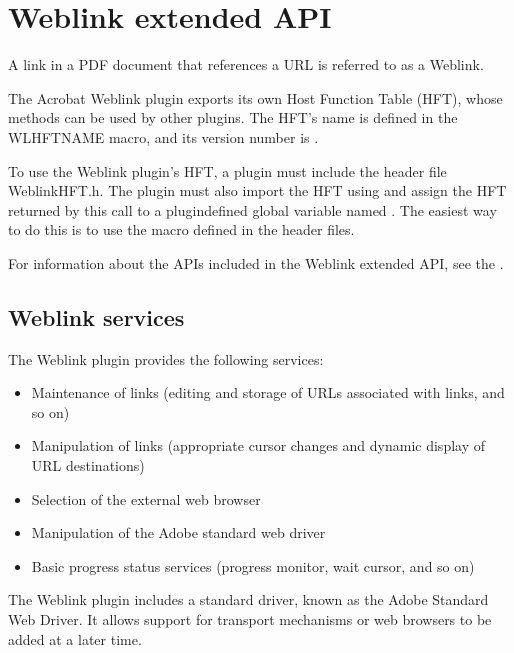 \documentclass[letterpaper,12pt,english,openany,oneside]{sphinxmanual}
\begin{document}
\section{Weblink extended API}
\label{\detokenize{Plugins_ExtendedAPI:weblink-extended-api}}
A link in a PDF document that references a URL is referred to as a Weblink.

The Acrobat Weblink plugin exports its own Host Function Table (HFT), whose methods can be used by other plugins. The HFT’s name is defined in the WLHFTNAME macro, and its version number is .

To use the Weblink plugin’s HFT, a plugin must include the header file WeblinkHFT.h. The plugin must also import the HFT using  and assign the HFT returned by this call to a plugin\sphinxhyphen{}defined global variable named . The easiest way to do this is to use the  macro defined in the header files.

For information about the APIs included in the Weblink extended API, see the .


\subsection{Weblink services}
\label{\detokenize{Plugins_ExtendedAPI:weblink-services}}
The Weblink plugin provides the following services:
\begin{itemize}
\item {} 
Maintenance of links (editing and storage of URLs associated with links, and so on)

\item {} 
Manipulation of links (appropriate cursor changes and dynamic display of URL destinations)

\item {} 
Selection of the external web browser

\item {} 
Manipulation of the Adobe standard web driver

\item {} 
Basic progress status services (progress monitor, wait cursor, and so on)

\end{itemize}

The Weblink plugin includes a standard driver, known as the Adobe Standard Web Driver. It allows support for transport mechanisms or web browsers to be added at a later time.
\end{document}
